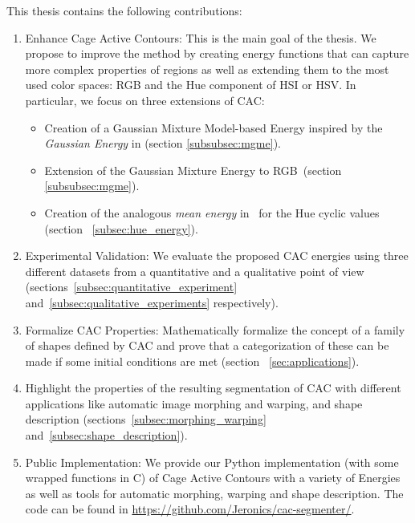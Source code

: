This thesis contains the following contributions:
\begin{enumerate}
	\item Enhance Cage Active Contours: This is the main goal of the thesis. We propose to improve the method by creating energy functions that can capture more complex properties of regions as well as extending them to the most used color spaces: RGB and the Hue component of HSI or HSV. In particular, we focus on three extensions of CAC:
	\begin{itemize}
		\item Creation of a Gaussian Mixture Model-based Energy inspired by the \textit{Gaussian Energy} in \cite{ipcac2015} (section \ref{subsubsec:mgme}). %
		\item Extension of the Gaussian Mixture Energy to RGB~(section \ref{subsubsec:mgme}).
		\item Creation of the analogous \textit{mean energy} in~\cite{ipcac2015}  for the Hue cyclic values (section ~\ref{subsec:hue_energy}).
	\end{itemize}
	
	\item Experimental Validation: We evaluate the proposed CAC energies using three different datasets from a quantitative and a qualitative point of view (sections~\ref{subsec:quantitative_experiment}  and~\ref{subsec:qualitative_experiments} respectively).
	
	\item Formalize CAC Properties: Mathematically formalize the concept of a family of shapes defined by CAC and prove that a categorization of these can be made if some initial conditions are met (section ~\ref{sec:applications}).
	
	\item Highlight the properties of the resulting segmentation of CAC with different applications like automatic image morphing and warping, and shape description (sections~\ref{subsec:morphing_warping} and~\ref{subsec:shape_description}).
	
	\item Public Implementation: We provide our Python implementation (with some wrapped functions in C) of Cage Active Contours with a variety of Energies as well as tools for automatic morphing, warping and shape description. The code can be found in \url{https://github.com/Jeronics/cac-segmenter/}.
	
\end{enumerate}



